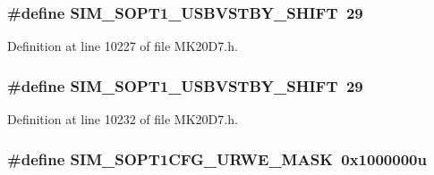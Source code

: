 \subsubsection[{\texorpdfstring{S\+I\+M\+\_\+\+S\+O\+P\+T1\+\_\+\+U\+S\+B\+V\+S\+T\+B\+Y\+\_\+\+S\+H\+I\+FT}{SIM_SOPT1_USBVSTBY_SHIFT}}]{\setlength{\rightskip}{0pt plus 5cm}\#define S\+I\+M\+\_\+\+S\+O\+P\+T1\+\_\+\+U\+S\+B\+V\+S\+T\+B\+Y\+\_\+\+S\+H\+I\+FT~29}\hypertarget{group___s_i_m___register___masks_gae945165e21faf14e58288bce0918482a}{}\label{group___s_i_m___register___masks_gae945165e21faf14e58288bce0918482a}


Definition at line 10227 of file M\+K20\+D7.\+h.

\subsubsection[{\texorpdfstring{S\+I\+M\+\_\+\+S\+O\+P\+T1\+\_\+\+U\+S\+B\+V\+S\+T\+B\+Y\+\_\+\+S\+H\+I\+FT}{SIM_SOPT1_USBVSTBY_SHIFT}}]{\setlength{\rightskip}{0pt plus 5cm}\#define S\+I\+M\+\_\+\+S\+O\+P\+T1\+\_\+\+U\+S\+B\+V\+S\+T\+B\+Y\+\_\+\+S\+H\+I\+FT~29}\hypertarget{group___s_i_m___register___masks_gae945165e21faf14e58288bce0918482a}{}\label{group___s_i_m___register___masks_gae945165e21faf14e58288bce0918482a}


Definition at line 10232 of file M\+K20\+D7.\+h.

\subsubsection[{\texorpdfstring{S\+I\+M\+\_\+\+S\+O\+P\+T1\+C\+F\+G\+\_\+\+U\+R\+W\+E\+\_\+\+M\+A\+SK}{SIM_SOPT1CFG_URWE_MASK}}]{\setlength{\rightskip}{0pt plus 5cm}\#define S\+I\+M\+\_\+\+S\+O\+P\+T1\+C\+F\+G\+\_\+\+U\+R\+W\+E\+\_\+\+M\+A\+SK~0x1000000u}\hypertarget{group___s_i_m___register___masks_gaa4e1ee8f60c8c15ad553c2dfb82c2039}{}\label{group___s_i_m___register___masks_gaa4e1ee8f60c8c15ad553c2dfb82c2039}



